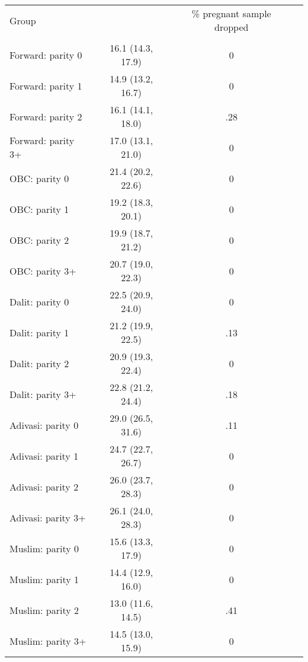 \begin{tabular}{lccc}
\toprule
Group &  & \% pregnant sample dropped \\\\
\midrule
Forward: parity 0&16.1 (14.3, 17.9)&0\\
Forward: parity 1&14.9 (13.2, 16.7)&0\\
Forward: parity 2&16.1 (14.1, 18.0)&.28\\
Forward: parity 3+&17.0 (13.1, 21.0)&0\\
OBC: parity 0&21.4 (20.2, 22.6)&0\\
OBC: parity 1&19.2 (18.3, 20.1)&0\\
OBC: parity 2&19.9 (18.7, 21.2)&0\\
OBC: parity 3+&20.7 (19.0, 22.3)&0\\
Dalit: parity 0&22.5 (20.9, 24.0)&0\\
Dalit: parity 1&21.2 (19.9, 22.5)&.13\\
Dalit: parity 2&20.9 (19.3, 22.4)&0\\
Dalit: parity 3+&22.8 (21.2, 24.4)&.18\\
Adivasi: parity 0&29.0 (26.5, 31.6)&.11\\
Adivasi: parity 1&24.7 (22.7, 26.7)&0\\
Adivasi: parity 2&26.0 (23.7, 28.3)&0\\
Adivasi: parity 3+&26.1 (24.0, 28.3)&0\\
Muslim: parity 0&15.6 (13.3, 17.9)&0\\
Muslim: parity 1&14.4 (12.9, 16.0)&0\\
Muslim: parity 2&13.0 (11.6, 14.5)&.41\\
Muslim: parity 3+&14.5 (13.0, 15.9)&0\\
\bottomrule
\end{tabular}
